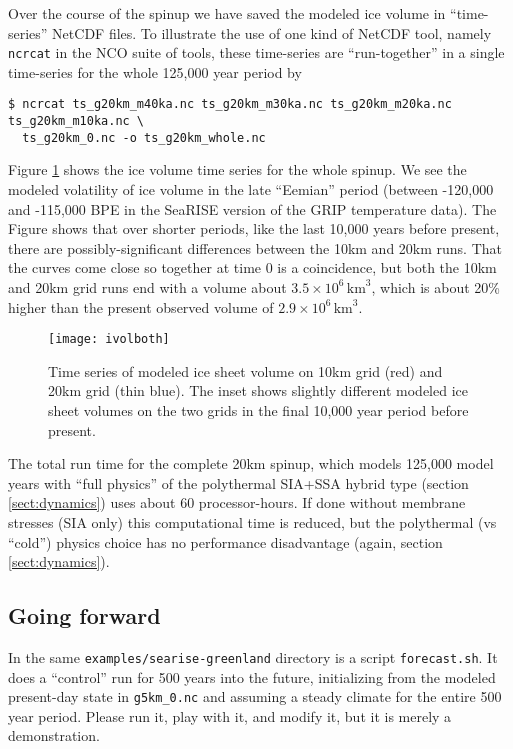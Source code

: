 Over the course of the spinup we have saved the modeled ice volume in ``time-series'' NetCDF files.  To illustrate the use of one kind of NetCDF tool, namely \verb|ncrcat| in the NCO suite of tools, these time-series are ``run-together'' in a single time-series for the whole 125,000 year period by
\begin{verbatim}
$ ncrcat ts_g20km_m40ka.nc ts_g20km_m30ka.nc ts_g20km_m20ka.nc ts_g20km_m10ka.nc \
  ts_g20km_0.nc -o ts_g20km_whole.nc
\end{verbatim}
\noindent Figure \ref{fig:sr-spindone-ivolboth} shows the ice volume time series for the whole spinup.  We see the modeled volatility of ice volume in the late ``Eemian'' period (between -120,000 and -115,000 BPE in the SeaRISE version of the GRIP temperature data).  The Figure shows that over shorter periods, like the last 10,000 years before present, there are possibly-significant differences between the 10km and 20km runs.  That the curves come close so together at time 0 is a coincidence, but both the 10km and 20km grid runs end with a volume about $3.5 \times 10^6\,\text{km}^3$, which is about 20\% higher than the present observed volume of $2.9 \times 10^6\,\text{km}^3$.

\begin{figure}[ht]
\centering
\texttt{[image: ivolboth]}
\caption{Time series of modeled ice sheet volume on 10km grid (red) and 20km grid (thin blue).  The inset shows slightly different modeled ice sheet volumes on the two grids in the final 10,000 year period before present.}
\label{fig:sr-spindone-ivolboth}
\end{figure}

The total run time for the complete 20km spinup, which models 125,000 model years with ``full physics'' of the polythermal SIA+SSA hybrid type (section \ref{sect:dynamics}) uses about 60 processor-hours.  If done without membrane stresses (SIA only) this computational time is reduced, but the polythermal (vs ``cold'') physics choice has no performance disadvantage (again, section \ref{sect:dynamics}).


\subsection{Going forward}  \label{subsect:forecastcaution}  In the same \verb|examples/searise-greenland| directory is a script \verb|forecast.sh|.  It does a ``control'' run for 500 years into the future, initializing from the modeled present-day state in \verb|g5km_0.nc| and assuming a steady climate for the entire 500 year period.  Please run it, play with it, and modify it, but it is merely a demonstration.

